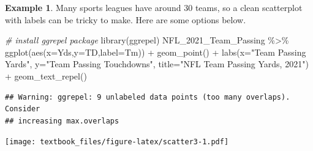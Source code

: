 \documentclass[
  11pt,
]{book}
\newenvironment{Shaded}{\begin{snugshade}}{\end{snugshade}}
\newcommand{\AttributeTok}[1]{\textcolor[rgb]{0.77,0.63,0.00}{#1}}
\newcommand{\CommentTok}[1]{\textcolor[rgb]{0.56,0.35,0.01}{\textit{#1}}}
\newcommand{\FunctionTok}[1]{\textcolor[rgb]{0.00,0.00,0.00}{#1}}
\newcommand{\NormalTok}[1]{#1}
\newcommand{\OtherTok}[1]{\textcolor[rgb]{0.56,0.35,0.01}{#1}}
\newcommand{\SpecialCharTok}[1]{\textcolor[rgb]{0.00,0.00,0.00}{#1}}
\newcommand{\StringTok}[1]{\textcolor[rgb]{0.31,0.60,0.02}{#1}}
\theoremstyle{definition}
\theoremstyle{definition}
\newtheorem{example}{Example}[chapter]
\theoremstyle{definition}
\theoremstyle{definition}
\theoremstyle{remark}
\begin{document}
\begin{example}
Many sports leagues have around 30 teams, so a clean scatterplot with labels can be tricky to make. Here are some options below.

\begin{Shaded}
\begin{Highlighting}[]
\CommentTok{\# install ggrepel package}
\FunctionTok{library}\NormalTok{(ggrepel)}
\NormalTok{NFL\_2021\_Team\_Passing }\SpecialCharTok{\%\textgreater{}\%}
  \FunctionTok{ggplot}\NormalTok{(}\FunctionTok{aes}\NormalTok{(}\AttributeTok{x=}\NormalTok{Yds,}\AttributeTok{y=}\NormalTok{TD,}\AttributeTok{label=}\NormalTok{Tm)) }\SpecialCharTok{+} 
  \FunctionTok{geom\_point}\NormalTok{() }\SpecialCharTok{+}
  \FunctionTok{labs}\NormalTok{(}\AttributeTok{x=}\StringTok{"Team Passing Yards"}\NormalTok{,}
       \AttributeTok{y=}\StringTok{"Team Passing Touchdowns"}\NormalTok{,}
       \AttributeTok{title=}\StringTok{"NFL Team Passing Yards, 2021"}\NormalTok{) }\SpecialCharTok{+}
  \FunctionTok{geom\_text\_repel}\NormalTok{()}
\end{Highlighting}
\end{Shaded}

\begin{verbatim}
## Warning: ggrepel: 9 unlabeled data points (too many overlaps). Consider
## increasing max.overlaps
\end{verbatim}

\texttt{[image: textbook\_files/figure-latex/scatter3-1.pdf]}

\newpage

\begin{Shaded}
\end{Shaded}
\end{example}
\end{document}
